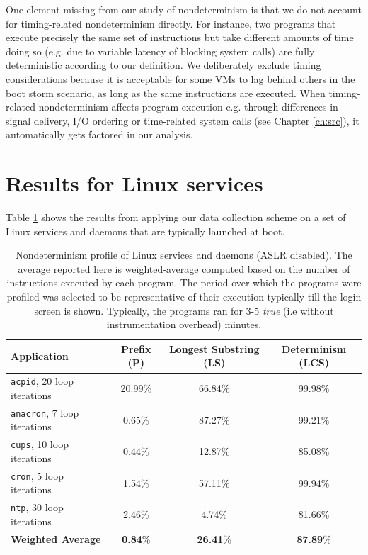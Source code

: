 One element missing from our study of nondeterminism is that
we do not account for timing-related
nondeterminism directly. For instance, two programs
that execute precisely the same set of instructions but 
take different amounts of time doing so (e.g. due
to variable latency of blocking system calls) are
fully deterministic according to our definition.
We deliberately exclude timing considerations because
it is acceptable for some VMs to lag behind others in the boot storm
scenario, as long as the same instructions are executed.
When timing-related nondeterminism affects program execution
e.g. through differences in signal delivery, I/O ordering
or time-related system calls (see Chapter \ref{ch:src}),
it automatically gets factored in our analysis.

\section{Results for Linux services} \label{bootresults}
Table \ref{linux:stats} shows the results from applying our data
collection scheme on a set of Linux services and daemons
that are typically launched at boot. \newline

\begin{table}[h]
\begin{center}
\begin{tabular}{||l|c|c|c||}\hline
  Application & Prefix (P) & Longest Substring (LS) &
  Determinism (LCS) \\
  \hline \hline
  \texttt{acpid}, 20 loop iterations & 20.99\% & 66.84\% & 99.98\%
  \\\hline
  \texttt{anacron}, 7 loop iterations & 0.65\% & 87.27\% & 99.21\%
  \\\hline
  \texttt{cups}, 10 loop iterations & 0.44\% & 12.87\% & 85.08\%
  \\\hline
  \texttt{cron}, 5 loop iterations & 1.54\% & 57.11\% & 99.94\% 
  \\\hline 
  \texttt{ntp}, 30 loop iterations & 2.46\% & 4.74\% & 81.66\%
  \\\hline
  \hline 
  {\bf Weighted Average} & {\bf 0.84}\% & {\bf 26.41}\% & {\bf 87.89}\%
  \\\hline 
\end{tabular}
\caption{Nondeterminism profile of Linux services and daemons (ASLR disabled). \newline
The average reported here is weighted-average computed based on the number of instructions
executed by each program. The period over which the 
programs were profiled was selected to be representative
of their execution typically till the login screen is shown.
Typically, the programs ran for 3-5 {\em true} (i.e without
instrumentation overhead) minutes.}
\label{linux:stats} 
\end{center}
\end{table}

